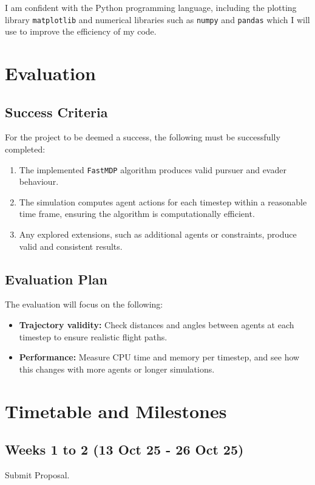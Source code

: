 \documentclass[12pt,a4paper,twoside]{article}
\begin{document}
I am confident with the Python programming language, including the plotting library \texttt{matplotlib} and numerical libraries such as \texttt{numpy} and \texttt{pandas} which I will use to improve the efficiency of my code.

\section{Evaluation}

\subsection{Success Criteria}

For the project to be deemed a success, the following must be successfully completed:

\begin{enumerate}
  \item The implemented \texttt{FastMDP} algorithm produces valid pursuer and evader behaviour. 
  \item The simulation computes agent actions for each timestep within a reasonable time frame, ensuring the algorithm is computationally efficient.
  \item Any explored extensions, such as additional agents or constraints, produce valid and consistent results.
\end{enumerate}

\subsection{Evaluation Plan}

The evaluation will focus on the following:

\begin{itemize}
    \item \textbf{Trajectory validity:} Check distances and angles between agents at each timestep to ensure realistic flight paths.
    \item \textbf{Performance:} Measure CPU time and memory per timestep, and see how this changes with more agents or longer simulations.
\end{itemize}


\newpage 


\section{Timetable and Milestones}

\subsection*{Weeks 1 to 2 (13 Oct 25 - 26 Oct 25)}
Submit Proposal.
\end{document}
